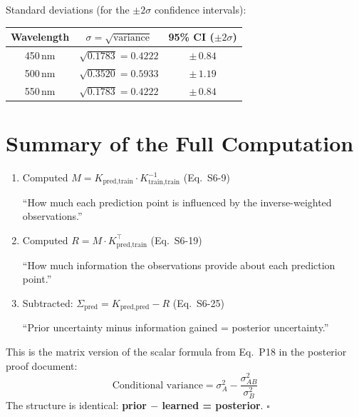 \documentclass[11pt, a4paper]{article}
\newcommand{\recap}[1]{\begin{tcolorbox}[colback=lightblue, colframe=secblue!50, title=Recap]#1\end{tcolorbox}}
\begin{document}
\bigskip
Standard deviations (for the $\pm 2\sigma$ confidence intervals):

\begin{center}
\begin{tabular}{ccc}
\toprule
\textbf{Wavelength} & $\sigma = \sqrt{\text{variance}}$ & \textbf{95\% CI} ($\pm 2\sigma$) \\
\midrule
450\,nm & $\sqrt{0.1783} = 0.4222$ & $\pm\, 0.84$ \\
500\,nm & $\sqrt{0.3520} = 0.5933$ & $\pm\, 1.19$ \\
550\,nm & $\sqrt{0.1783} = 0.4222$ & $\pm\, 0.84$ \\
\bottomrule
\end{tabular}
\end{center}


\section*{\color{secblue}Summary of the Full Computation}

\begin{enumerate}
\item Computed $M = K_{\text{pred,train}} \cdot K_{\text{train,train}}^{-1}$ \hfill (Eq.~S6-9)

``How much each prediction point is influenced by the inverse-weighted observations.''

\item Computed $R = M \cdot K_{\text{pred,train}}^\top$ \hfill (Eq.~S6-19)

``How much information the observations provide about each prediction point.''

\item Subtracted: $\Sigma_{\text{pred}} = K_{\text{pred,pred}} - R$ \hfill (Eq.~S6-25)

``Prior uncertainty minus information gained = posterior uncertainty.''
\end{enumerate}

\recap{
This is the matrix version of the scalar formula from Eq.~P18 in the posterior proof document:
$$\text{Conditional variance} = \sigma_A^2 - \frac{\sigma_{AB}^2}{\sigma_B^2}$$
The structure is identical: \textbf{prior $-$ learned = posterior}. $\square$
}
\end{document}
